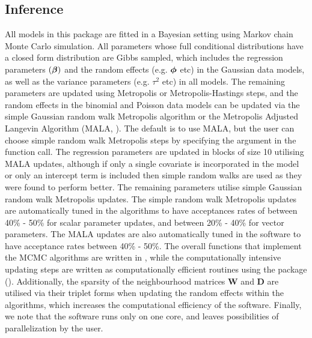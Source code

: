 \documentclass[article, nojss]{jss}
\newcommand{\bd}[1]{\ensuremath{\mbox{\boldmath $#1$}}}
\begin{document}
\subsection{Inference}
All models in this package are fitted in a Bayesian setting using Markov chain Monte Carlo simulation. All parameters whose full conditional distributions have a closed form distribution are Gibbs sampled, which includes the regression parameters $(\bd{\beta})$ and the random effects (e.g. $\bd{\phi}$ etc) in the Gaussian data models, as well as the variance parameters (e.g. $\tau^2$ etc) in all models. The remaining parameters are updated using Metropolis or Metropolis-Hastings steps, and the random effects in the binomial and Poisson data models can be updated via the simple Gaussian random walk Metropolis algorithm or the Metropolis Adjusted Langevin Algorithm (MALA, \citealp{roberts1998}). The default is to use MALA, but the user can choose simple random walk Metropolis steps by specifying the  argument in the function call. The regression parameters are updated in blocks of size 10 utilising MALA updates, although if only a single covariate is incorporated in the model or only an intercept term is included then simple random walks are used as they were found to perform better. The remaining parameters utilise simple Gaussian random walk Metropolis updates. The simple random walk Metropolis updates are automatically tuned in the algorithms to have acceptances rates of between 40\% - 50\% for scalar parameter updates, and between 20\% - 40\% for vector parameters. The MALA updates are also automatically tuned in the software to have acceptance rates between 40\% - 50\%. The overall functions that implement the MCMC algorithms are written in , while the computationally intensive updating steps are written as computationally efficient   routines using the  package  (\citealp{eddelbuettel2011}). Additionally, the sparsity of the neighbourhood matrices $\mathbf{W}$ and $\mathbf{D}$ are utilised via their triplet forms when updating the random effects  within the algorithms, which increases the computational efficiency of the software. Finally, we note that the software runs only on one core, and leaves possibilities of parallelization by the user.\\
\end{document}

